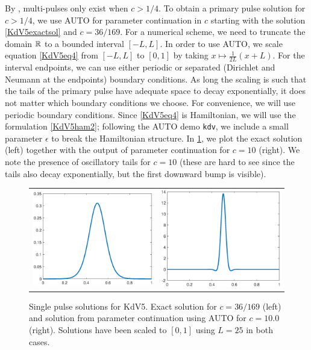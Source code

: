 \documentclass[thesis2.tex]{subfiles}
\begin{document}
By \cite{Pelinovsky2007}, multi-pulses only exist when $c > 1/4$. To obtain a primary pulse solution for $c > 1/4$, we use AUTO for parameter continuation in $c$ starting with the solution \cref{KdV5exactsol} and $c = 36/169$. For a numerical scheme, we need to truncate the domain $\mathbb{R}$ to a bounded interval $[-L, L]$. In order to use AUTO, we scale equation \cref{KdV5eq4} from $[-L, L]$ to $[0, 1]$ by taking $x \mapsto \frac{1}{2L}(x + L)$. For the interval endpoints, we can use either periodic or separated (Dirichlet and Neumann at the endpoints) boundary conditions. As long the scaling is such that the tails of the primary pulse have adequate space to decay exponentially, it does not matter which boundary conditions we choose. For convenience, we will use periodic boundary conditions. Since \cref{KdV5eq4} is Hamiltonian, we will use the formulation \cref{KdV5ham2}; following the AUTO demo \texttt{kdv}, we include a small parameter $\epsilon$ to break the Hamiltonian structure. In \cref{fig:KdV5singlepulse}, we plot the exact solution (left) together with the output of parameter continuation for $c = 10$ (right). We note the presence of oscillatory tails for $c = 10$ (these are hard to see since the tails also decay exponentially, but the first downward bump is visible).
\begin{figure}
\begin{center}
\begin{tabular}{cc}
\includegraphics[width=8cm]{images/kdv5numerics/singleexact.eps} &
\includegraphics[width=8cm]{images/kdv5numerics/single10}
\end{tabular}
\caption[Primary pulse solutions for KdV5]{Single pulse solutions for KdV5. Exact solution for $c = 36/169$ (left) and solution from parameter continuation using AUTO for $c = 10.0$ (right). Solutions have been scaled to $[0, 1]$ using $L = 25$ in both cases.}
\label{fig:KdV5singlepulse}
\end{center}
\end{figure}
\end{document}
